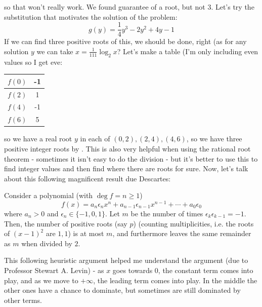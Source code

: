 \documentclass[11pt,titlepage]{scrartcl}
\begin{document}
so that won't really work. We found guarantee of a root, but not $3$. Let's try the substitution that motivates the solution of the problem:
\[g(y)=\dfrac 14y^3-2y^2+4y-1\]
If we can find three positive roots of this, we should be done, right (as for any solution $y$ we can take $x=\frac 1{111}\log_2 x$? Let's make a table (I'm only including even values so I get eve:
\begin{center}
 \begin{tabular}{|c | c|} 
 \hline
 $f(0)$ & -1\\
 \hline
 $f(2)$ & 1\\ 
 \hline
 $f(4)$ & -1 \\
 \hline
 $f(6)$ & 5 \\
 \hline
\end{tabular}
\end{center}
so we have a real root $y$ in each of $(0,2),(2,4),(4,6)$, so we have three positive integer roots by . This is also very helpful when using the rational root theorem - sometimes it isn't easy to do the division - but it's better to use this to find integer values and then find where there are roots for sure. Now, let's talk about this following magnificent result due Descartes:
\begin{theorem}\label{drs}
Consider a polynomial (with $\deg f=n\geq 1$)
\[f(x)=a_n\epsilon_nx^n+a_{n-1}\epsilon_{n-1}x^{n-1}+\cdots+a_0\epsilon_0\]
where $a_n>0$ and $\epsilon_n\in\{-1,0,1\}$. Let $m$ be the number of times $\epsilon_k\epsilon_{k-1}=-1$. Then, the number of positive roots (say $p$) (counting multiplicities, i.e. the roots of $(x-1)^2$ are $1,1$) is at most $m$, and furthermore leaves the same remainder as $m$ when divided by $2$.
\end{theorem}
\begin{remark}
This following heuristic argument helped me understand the argument (due to Professor Stewart A. Levin) - as $x$ goes towards $0$, the constant term comes into play, and as we move to $+\infty$, the leading term comes into play. In the middle the other ones have a chance to dominate, but sometimes are still dominated by other terms.
\end{remark}
\end{document}
